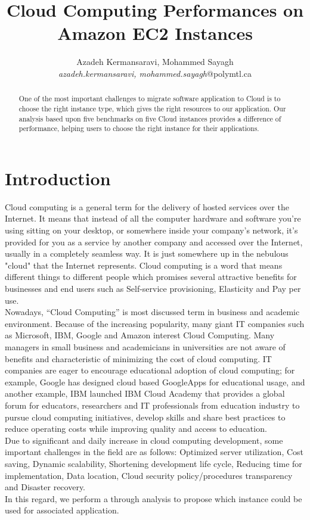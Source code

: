 \documentclass[10pt, conference]{IEEEtran}
\title{Cloud Computing Performances on Amazon EC2 Instances}
\author{Azadeh Kermansaravi, Mohammed Sayagh
    \\
    \emph{azadeh.kermansaravi, mohammed.sayagh}@polymtl.ca}
\begin{document}
\maketitle

\begin{abstract}
One of the most important challenges to migrate software application to Cloud is to choose the right instance type, which gives the right resources to our application. Our analysis based upon five benchmarks on five Cloud instances provides a difference of performance, helping users to choose the right instance for their applications. 
\end{abstract}

\section{Introduction}
\label{sec:introduction}


\indent Cloud computing is a general term for the delivery of hosted services over the Internet. It means that instead of all the computer hardware and software you're using sitting on your desktop, or somewhere inside your company's network, it's provided for you as a service by another company and accessed over the Internet, usually in a completely seamless way. It is just somewhere up in the nebulous "cloud" that the Internet represents. Cloud computing is a word that means different things to different people which promises several attractive benefits for businesses and end users such as Self-service provisioning, Elasticity and Pay per use.\\
\indent Nowadays, “Cloud Computing” is most discussed term in business and academic environment. Because of the increasing popularity, many giant IT companies such as Microsoft, IBM, Google and Amazon interest Cloud Computing. Many managers in small business and academicians in universities are not aware of benefits and characteristic of minimizing the cost of cloud computing. IT companies are eager to encourage educational adoption of cloud computing; for example, Google has designed cloud based GoogleApps for educational usage, and another example, IBM launched IBM Cloud Academy that provides a global forum for educators, researchers and IT professionals from education industry to pursue cloud computing initiatives, develop skills and share best practices to reduce operating costs while improving quality and access to education.\\
\indent Due to significant and daily increase in cloud computing development, some important challenges in the field are as follows: Optimized server utilization, Cost saving, Dynamic scalability, Shortening development life cycle, Reducing time for implementation, Data location, Cloud security policy/procedures transparency and Disaster recovery.\\
\indent In this regard, we perform a through analysis to propose which instance could be used for associated application.
\end{document}
